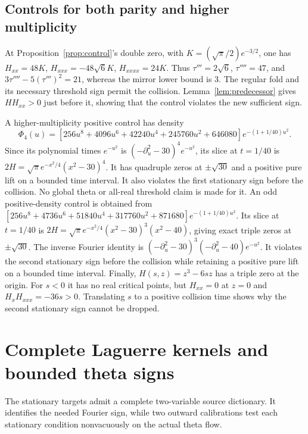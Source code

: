 \documentclass[11pt]{article}
\theoremstyle{definition}
\theoremstyle{remark}
\begin{document}
\subsection{Controls for both parity and higher multiplicity}

At Proposition~\ref{prop:control}'s double zero, with
$K=(\sqrt\pi/2)e^{-3/2}$, one has
$H_{xx}=48K$, $H_{xxx}=-48\sqrt6K$, $H_{xxxx}=24K$.
Thus $\tau'''=2\sqrt6$, $\tau''''=47$, and
$3\tau''''-5(\tau''')^2=21$, whereas the mirror lower bound is $3$.
The regular fold and its necessary threshold sign permit the collision.
Lemma~\ref{lem:predecessor} gives $HH_{xx}>0$ just before it, showing
that the control violates the new sufficient sign.

A higher-multiplicity positive control has density
\begin{equation}
 \Phi_4(u)=[256u^8+4096u^6+42240u^4+245760u^2+646080]
 e^{-(1+1/40)u^2}.
 \label{eq:quadruple-density}
\end{equation}
Since its polynomial times $e^{-u^2}$ is
$(-\partial_u^2-30)^4e^{-u^2}$, its slice at $t=1/40$ is
$2H=\sqrt\pi e^{-x^2/4}(x^2-30)^4$.
It has quadruple zeros at $\pm\sqrt{30}$ and a positive pure lift on a
bounded time interval. It also violates the first stationary sign before
the collision. No global theta or all-real threshold claim is made for it.
An odd positive-density control is obtained from
$[256u^8+4736u^6+51840u^4+317760u^2+871680]e^{-(1+1/40)u^2}$.
Its slice at $t=1/40$ is
$2H=\sqrt\pi e^{-x^2/4}(x^2-30)^3(x^2-40)$, giving exact triple
zeros at $\pm\sqrt{30}$. The inverse Fourier identity is
$(-\partial_u^2-30)^3(-\partial_u^2-40)e^{-u^2}$.
It violates the second stationary sign before the collision while
retaining a positive pure lift on a bounded time interval.
Finally, $H(s,z)=z^3-6sz$ has a triple zero at the origin. For $s<0$
it has no real critical points, but $H_{xx}=0$ at $z=0$ and
$H_xH_{xxx}=-36s>0$. Translating $s$ to a positive collision time shows
why the second stationary sign cannot be dropped.

\section{Complete Laguerre kernels and bounded theta signs}
\label{sec:theta-signs}

The stationary targets admit a complete two-variable source dictionary.
It identifies the needed Fourier sign, while two outward calibrations
test each stationary condition nonvacuously on the actual theta flow.
\end{document}
